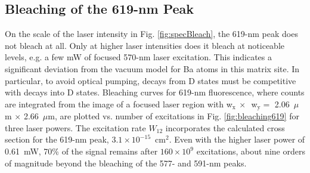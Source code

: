 
\subsection{Bleaching of the 619-nm Peak}


On the scale of the laser intensity in Fig. \ref{fig:specBleach}, the 619-nm peak does not bleach at all.  Only at higher laser intensities does it bleach at noticeable levels, e.g. a few mW of focused 570-nm laser excitation.  This indicates a significant deviation from the vacuum model for Ba atoms in this matrix site.  In particular, to avoid optical pumping, decays from D states must be competitive with decays into D states.  Bleaching curves for 619-nm fluorescence, where counts are integrated from the image of a focused laser region with w$_{\text{x}}~\times$~w$_{\text{y}} =$ 2.06~$\mu$m $\times$ 2.66~$\mu$m, are plotted vs. number of excitations in Fig. \ref{fig:bleaching619} for three laser powers.  The excitation rate $W_{12}$ incorporates the calculated cross section for the 619-nm peak, $3.1 \times 10^{-15}$~cm$^{2}$.  Even with the higher laser power of 0.61~mW, 70\% of the signal remains after $160 \times 10^{9}$ excitations, about nine orders of magnitude beyond the bleaching of the 577- and 591-nm peaks.



